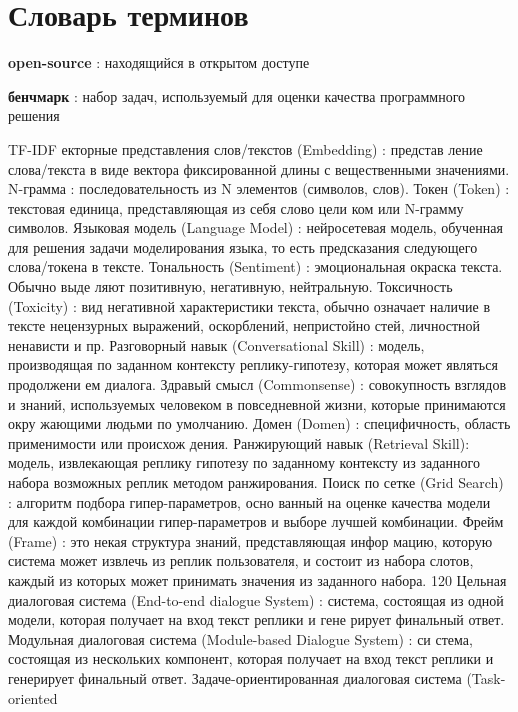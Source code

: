 \chapter*{Словарь терминов}             %
\iffalse
\textbf{open-source} : находящийся в открытом доступе

\textbf{бенчмарк} : набор задач, используемый для оценки качества программного решения

TF-IDF
екторные представления слов/текстов (Embedding) : представ
ление слова/текста в виде вектора фиксированной длины с вещественными
значениями.
N-грамма : последовательность из N элементов (символов, слов).
Токен (Token) : текстовая единица, представляющая из себя слово цели
ком или N-грамму символов.
Языковая модель (Language Model) : нейросетевая модель, обученная
для решения задачи моделирования языка, то есть предсказания следующего
слова/токена в тексте.
Тональность (Sentiment) : эмоциональная окраска текста. Обычно выде
ляют позитивную, негативную, нейтральную.
Токсичность (Toxicity) : вид негативной характеристики текста, обычно
означает наличие в тексте нецензурных выражений, оскорблений, непристойно
стей, личностной ненависти и пр.
Разговорный навык (Conversational Skill) : модель, производящая по
заданном контексту реплику-гипотезу, которая может являться продолжени
ем диалога.
Здравый смысл (Commonsense) : совокупность взглядов и знаний,
используемых человеком в повседневной жизни, которые принимаются окру
жающими людьми по умолчанию.
Домен (Domen) : специфичность, область применимости или происхож
дения.
Ранжирующий навык (Retrieval Skill): модель, извлекающая реплику
гипотезу по заданному контексту из заданного набора возможных реплик
методом ранжирования.
Поиск по сетке (Grid Search) : алгоритм подбора гипер-параметров, осно
ванный на оценке качества модели для каждой комбинации гипер-параметров
и выборе лучшей комбинации.
Фрейм (Frame) : это некая структура знаний, представляющая инфор
мацию, которую система может извлечь из реплик пользователя, и состоит из
набора слотов, каждый из которых может принимать значения из заданного
набора.
120
Цельная диалоговая система (End-to-end dialogue System) : система,
состоящая из одной модели, которая получает на вход текст реплики и гене
рирует финальный ответ.
Модульная диалоговая система (Module-based Dialogue System) : си
стема, состоящая из нескольких компонент, которая получает на вход текст
реплики и генерирует финальный ответ.
Задаче-ориентированная диалоговая система (Task-oriented
